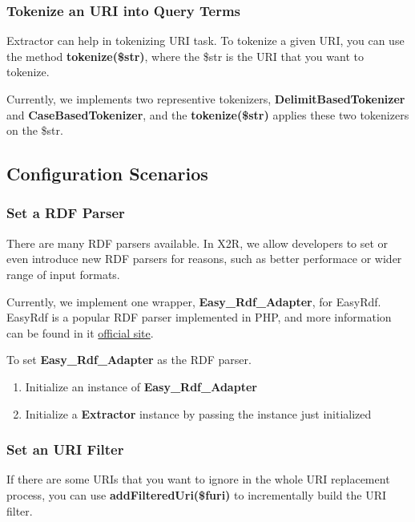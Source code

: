 \documentclass[letterpaper,10pt,english]{sphinxmanual}
\begin{document}
\subsubsection{Tokenize an URI into Query Terms}
\label{docs/scenarios/extractor:tokenize-an-uri-into-query-terms}
Extractor can help in tokenizing URI task. To tokenize a given URI, you can use the method \textbf{tokenize(\$str)}, where the \$str is the URI that you want to tokenize.

Currently, we implements two representive tokenizers, \textbf{DelimitBasedTokenizer} and \textbf{CaseBasedTokenizer}, and the \textbf{tokenize(\$str)} applies these two tokenizers on the \$str.


\subsection{Configuration Scenarios}
\label{docs/scenarios/extractor:configuration-scenarios}

\subsubsection{Set a RDF Parser}
\label{docs/scenarios/extractor:set-a-rdf-parser}
There are many RDF parsers available. In X2R, we allow developers to set or even introduce new RDF parsers for reasons, such as better performace or wider range of input formats.

Currently, we implement one wrapper, \textbf{Easy\_Rdf\_Adapter}, for EasyRdf. EasyRdf is a popular RDF parser implemented in PHP, and more information can be found in it \href{http://www.easyrdf.org/}{official site}.

To set \textbf{Easy\_Rdf\_Adapter} as the RDF parser.
\begin{enumerate}
\item {} 
Initialize an instance of \textbf{Easy\_Rdf\_Adapter}

\item {} 
Initialize a \textbf{Extractor} instance by passing the instance just initialized

\end{enumerate}


\subsubsection{Set an URI Filter}
\label{docs/scenarios/extractor:set-an-uri-filter}
If there are some URIs that you want to ignore in the whole URI replacement process, you can use \textbf{addFilteredUri(\$furi)} to incrementally build the URI filter.
\end{document}
